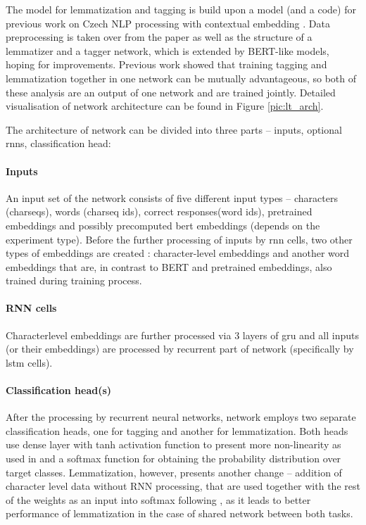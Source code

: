 The model for lemmatization and tagging is build upon a model (and a code) for previous work on Czech NLP processing with contextual embedding \citep{straka2019czech}. 
Data preprocessing is taken over from the paper as well as the structure of a lemmatizer and a tagger network, which is extended by BERT-like models, hoping for improvements. %
Previous work showed that training tagging and lemmatization together in one network can be mutually advantageous, so both of these analysis are an output of one network and are trained jointly. Detailed visualisation of network architecture can be found in Figure \ref{pic:lt_arch}. \par The architecture of network can be divided into three parts -- inputs, optional \acrshort{rnn}s, classification head:
\paragraph{Inputs}
An input set of the network consists of five different input types -- characters (charseqs), words (charseq ids), correct responses(word ids), pretrained embeddings and possibly precomputed bert embeddings (depends on the experiment type). Before the further processing of inputs by \acrshort{rnn} cells, two other types of embeddings are created : character-level embeddings and another word embeddings that are, in contrast to BERT and pretrained embeddings, also trained during training process.

\paragraph{RNN cells}
Characterlevel embeddings are further processed via 3 layers of \acrfull{gru} and all inputs (or their embeddings) are processed by recurrent part of network (specifically by \acrfull{lstm} cells).

\paragraph{Classification head(s)}
After the processing by recurrent neural networks, network employs two separate classification heads, one for tagging and another for lemmatization. Both heads use dense layer with tanh activation function to present more non-linearity as used in \citep{Straka2018} and a softmax function for obtaining the probability distribution over target classes. Lemmatization, however, presents another change -- addition of character level data without RNN processing, that are used together with the rest of the weights as an input into softmax following \citep{Straka2018}, as it leads to better performance of lemmatization in the case of shared network between both tasks.

